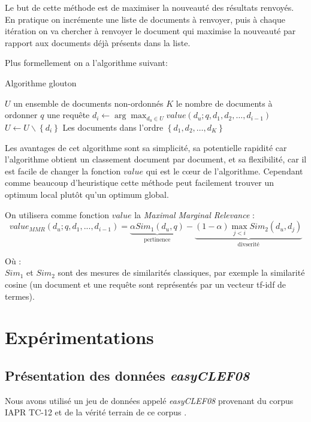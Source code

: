 \documentclass{article}
\begin{document}
Le but de cette méthode est de maximiser la nouveauté des résultats renvoyés. En pratique on incrémente une liste de documents à renvoyer, puis à chaque itération on va chercher à renvoyer le document qui maximise la nouveauté par rapport aux documents déjà présents dans la liste.

Plus formellement on a l'algorithme suivant:

\begin{algorithm}
\caption{Algorithme glouton}
\begin{algorithmic}
\REQUIRE $U$ un ensemble de documents non-ordonnés
\REQUIRE $K$ le nombre de documents à ordonner
\REQUIRE $q$ une requête
\STATE $d_i \leftarrow \arg\max_{d_u \in U} value(d_u;q, d_1,d_2,\dots,d_{i-1})$ 
\STATE $U \leftarrow U \backslash \left\{d_i\right\}$
\ENDFOR
\RETURN Les documents dans l'ordre $\left\{d_1, d_2,\dots, d_K\right\}$
\end{algorithmic}
\end{algorithm}

Les avantages de cet algorithme sont sa simplicité, sa potentielle rapidité car l'algorithme obtient un classement document par document, et sa flexibilité, car il est facile de changer la fonction $value$ qui est le cœur de l'algorithme. Cependant comme beaucoup d'heuristique cette méthode peut facilement trouver un optimum local plutôt qu'un optimum global.


On utilisera comme fonction $value$ la \textit{Maximal Marginal Relevance} : 
$$value_{MMR}(d_u;q,d_1,...,d_{i-1}) = \underbrace{\alpha Sim_{1}(d_u,q)}_{\text{pertinence}} - \underbrace{(1-\alpha)\max\limits_{j < i} Sim_{2}(d_u, d_j)}_{\text{divserité}}$$

Où :\\
$Sim_{1}$ et $Sim_{2}$ sont des mesures de similarités classiques, par exemple la similarité cosine (un document et une requête sont représentés par un vecteur tf-idf de termes).

\newpage
\section{Expérimentations}
\subsection{Présentation des données \textit{easyCLEF08}}
Nous avons utilisé un jeu de données appelé \textit{easyCLEF08} provenant du corpus IAPR TC-12 \cite{grubinger06} et de la vérité terrain de ce corpus \cite{arni08}. 
\end{document}
